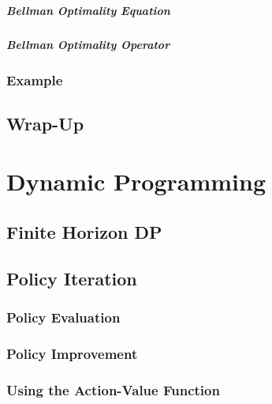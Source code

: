 				\paragraph{Bellman Optimality Equation} %

				\paragraph{Bellman Optimality Operator} %

		\subsection{Example} %

	\section{Wrap-Up} %

\chapter{Dynamic Programming} %

	\section{Finite Horizon DP} %

	\section{Policy Iteration} %

		\subsection{Policy Evaluation} %

		\subsection{Policy Improvement} %

		\subsection{Using the Action-Value Function} %

